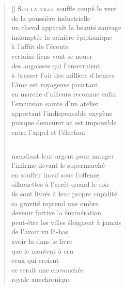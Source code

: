\documentclass[a4paper, titlepage, twoside, 12pt]{book}
\begin{document}
\begin{verse}[\versewidth]
{\lettrine[lines=1]{\textcolor[gray]{0.6}{S}}{\space ur la ville} souffle coupé le vent}\\
de la poussière industrielle\\
un cheval apparaît la beauté sauvage\\
indomptée la crinière épiphanique\\
à l'affût de l'écoute\\
certains liens vont se nouer\\
des angoisses qui l'enserraient\\
à brasser l'air des milliers d'heures\\
l'âme est voyageuse pourtant\\
en marche d'ailleurs reconnue enfin\\
l'excursion sainte d'un atelier\\
apportant l'indispensable oxygène\\
puisque demeurer ici est impossible\\
entre l'appel et l'élection

\subsection*{}
mendiant leur argent pour manger\\
l'infirme devant le supermarché\\
en souffrir inouï sous l'offense\\
silhouettes à l'arrêt quand le soir\\
ils sont livrés à leur propre cupidité\\
sa gravité reprend une ombre\\
devenir furtive la énumération\\
peut-être les villes éloignent à jamais\\
de l'avoir vu là-bas\\
avoir lu dans le livre\\
que le montent à cru\\
ceux qui croient\\
ce serait une chevauchée\\
royale anachronique



\end{verse}
\end{document}
